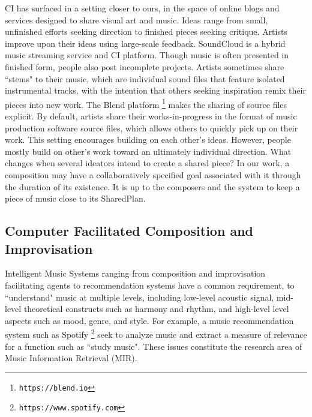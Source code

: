 \documentclass[final,authoryear,5p,times,twocolumn]{elsarticle}
\begin{document}
CI has surfaced in a setting closer to ours, in the space of online blogs and services designed to share visual art and music. Ideas range from small, unfinished efforts seeking direction to finished pieces seeking critique. Artists improve upon their ideas using large-scale feedback. SoundCloud is a hybrid music streaming service and CI platform. Though music is often presented in finished form, people also post incomplete projects. Artists sometimes share ``stems" to their music, which are individual sound files that feature isolated instrumental tracks, with the intention that others seeking inspiration remix their pieces into new work. The Blend platform \footnote{\texttt{https://blend.io}} makes the sharing of source files explicit. By default, artists share their works-in-progress in the format of music production software source files, which allows others to quickly pick up on their work. This setting encourages building on each other's ideas. However, people mostly build on other's work toward an ultimately individual direction. What changes when several ideators intend to create a shared piece? In our work, a composition may have a collaboratively specified goal associated with it through the duration of its existence. It is up to the composers and the system to keep a piece of music close to its SharedPlan.

\subsection{Computer Facilitated Composition and Improvisation}

Intelligent Music Systems ranging from composition and improvisation facilitating agents to recommendation systems have a common requirement, to ``understand" music at multiple levels, including low-level acoustic signal, mid-level theoretical constructs such as harmony and rhythm, and high-level level aspects such as mood, genre, and style. For example, a music recommendation system such as Spotify \footnote{\texttt{https://www.spotify.com}} seek to analyze music and extract a measure of relevance for a function such as ``study music". These issues constitute the research area of Music Information Retrieval (MIR).
\end{document}
